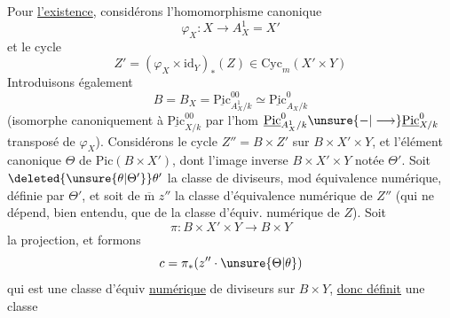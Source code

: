 Pour \uline{l'existence}, considérons l'homomorphisme canonique
\[
\varphi_X:X\longrightarrow A_X^1=X'
\]
et le cycle
\[
Z'=(\varphi_X\times\mathrm{id}_Y)_*(Z)\in\mathrm{Cyc}_m(X'\times Y)
\]
Introduisons également
\[
B=B_X=\underline{\mathrm{Pic}}^{00}_{A_X^1/k}\simeq\underline{\mathrm{Pic}}^0_{A_X/k}
\]
(isomorphe canoniquement à $\underline{\mathrm{Pic}}^{00}_{X/k}$ par l'hom $\underline{\mathrm{Pic}}^0_{A_X^1/k}\unsure{-|\longrightarrow}\underline{\mathrm{Pic}}^0_{X/k}$ transposé de $\varphi_X$). Considérons le cycle $Z''=B\times Z'$ sur $B\times X'\times Y$, et l'élément canonique $\Theta$ de $\mathrm{Pic}(B\times X')$, dont l'image inverse  $B\times X'\times Y$  notée $\Theta'$. Soit $\deleted{\unsure{\theta|\Theta'}}\theta'$ la classe de diviseurs, mod équivalence numérique, définie par $\Theta'$, et soit de $\overline{\mathrm{m}}$ $z''$ la classe d'équivalence numérique de $Z''$ (qui ne dépend, bien entendu, que de la classe d'équiv. numérique de $Z$). Soit \deleted{$\unsure{\pi:}$}
\[
\pi:B\times X'\times Y\longrightarrow B\times Y
\]
la projection, et formons
\[
c=\pi_*(z''\cdot\unsure{\Theta|\theta})
\]
qui est une classe d'équiv \uline{numérique} de diviseurs sur $B\times Y$, \uline{donc définit} une classe
